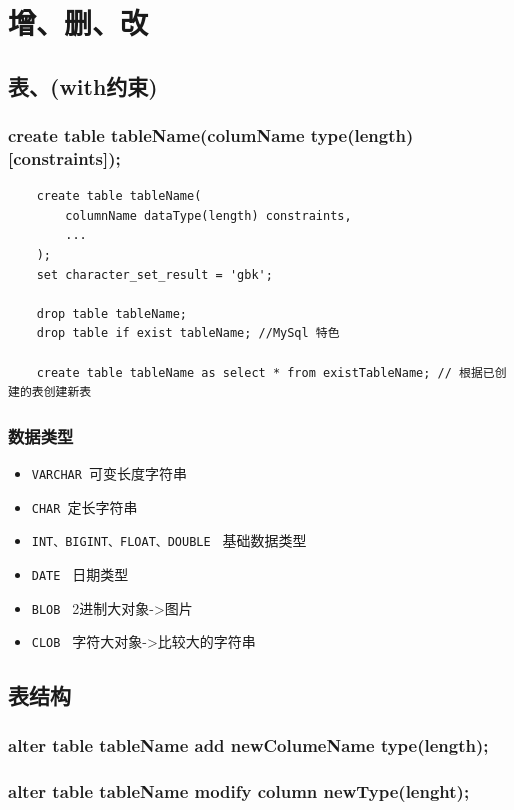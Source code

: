 \documentclass[UTF8,a4paper,12pt]{ctexbook}
\begin{document}
\chapter{增、删、改}
	\section{表、(with约束)}
		\subsection{create table tableName(columName type(length) [constraints]);}
			\begin{lstlisting}
	create table tableName(
		columnName dataType(length) constraints,
		...
	);
	set character_set_result = 'gbk';
	
	drop table tableName;
	drop table if exist tableName; //MySql 特色
	
	create table tableName as select * from existTableName; // 根据已创建的表创建新表
			\end{lstlisting}
		
		\subsection{数据类型}
			\begin{itemize}
				\item \verb|VARCHAR |可变长度字符串
				\item \verb|CHAR |定长字符串
				\item \verb|INT、BIGINT、FLOAT、DOUBLE | 基础数据类型
				\item \verb|DATE | 日期类型
				\item \verb|BLOB | 2进制大对象->图片
				\item \verb|CLOB | 字符大对象->比较大的字符串
			\end{itemize}
			
	\section{表结构}	
		\subsection{alter table tableName add newColumeName type(length);}
		
		\subsection{alter table tableName modify column newType(lenght);}
		
\end{document}
